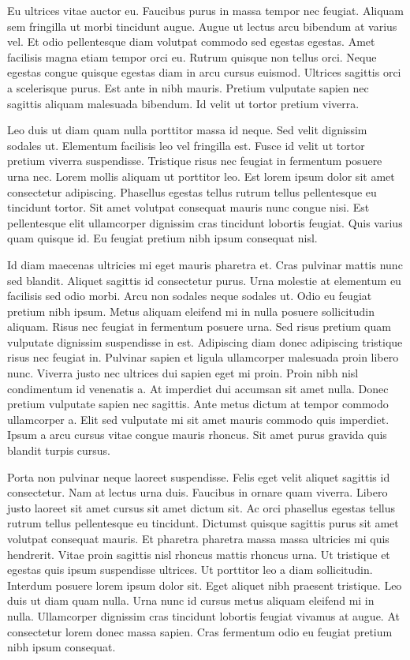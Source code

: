 \documentclass[11pt,a4paper]{article}
\begin{document}
Eu ultrices vitae auctor eu. Faucibus purus in massa tempor nec feugiat. Aliquam sem fringilla ut morbi tincidunt augue. Augue ut lectus arcu bibendum at varius vel. Et odio pellentesque diam volutpat commodo sed egestas egestas. Amet facilisis magna etiam tempor orci eu. Rutrum quisque non tellus orci. Neque egestas congue quisque egestas diam in arcu cursus euismod. Ultrices sagittis orci a scelerisque purus. Est ante in nibh mauris. Pretium vulputate sapien nec sagittis aliquam malesuada bibendum. Id velit ut tortor pretium viverra.

Leo duis ut diam quam nulla porttitor massa id neque. Sed velit dignissim sodales ut. Elementum facilisis leo vel fringilla est. Fusce id velit ut tortor pretium viverra suspendisse. Tristique risus nec feugiat in fermentum posuere urna nec. Lorem mollis aliquam ut porttitor leo. Est lorem ipsum dolor sit amet consectetur adipiscing. Phasellus egestas tellus rutrum tellus pellentesque eu tincidunt tortor. Sit amet volutpat consequat mauris nunc congue nisi. Est pellentesque elit ullamcorper dignissim cras tincidunt lobortis feugiat. Quis varius quam quisque id. Eu feugiat pretium nibh ipsum consequat nisl.

Id diam maecenas ultricies mi eget mauris pharetra et. Cras pulvinar mattis nunc sed blandit. Aliquet sagittis id consectetur purus. Urna molestie at elementum eu facilisis sed odio morbi. Arcu non sodales neque sodales ut. Odio eu feugiat pretium nibh ipsum. Metus aliquam eleifend mi in nulla posuere sollicitudin aliquam. Risus nec feugiat in fermentum posuere urna. Sed risus pretium quam vulputate dignissim suspendisse in est. Adipiscing diam donec adipiscing tristique risus nec feugiat in. Pulvinar sapien et ligula ullamcorper malesuada proin libero nunc. Viverra justo nec ultrices dui sapien eget mi proin. Proin nibh nisl condimentum id venenatis a. At imperdiet dui accumsan sit amet nulla. Donec pretium vulputate sapien nec sagittis. Ante metus dictum at tempor commodo ullamcorper a. Elit sed vulputate mi sit amet mauris commodo quis imperdiet. Ipsum a arcu cursus vitae congue mauris rhoncus. Sit amet purus gravida quis blandit turpis cursus.

Porta non pulvinar neque laoreet suspendisse. Felis eget velit aliquet sagittis id consectetur. Nam at lectus urna duis. Faucibus in ornare quam viverra. Libero justo laoreet sit amet cursus sit amet dictum sit. Ac orci phasellus egestas tellus rutrum tellus pellentesque eu tincidunt. Dictumst quisque sagittis purus sit amet volutpat consequat mauris. Et pharetra pharetra massa massa ultricies mi quis hendrerit. Vitae proin sagittis nisl rhoncus mattis rhoncus urna. Ut tristique et egestas quis ipsum suspendisse ultrices. Ut porttitor leo a diam sollicitudin. Interdum posuere lorem ipsum dolor sit. Eget aliquet nibh praesent tristique. Leo duis ut diam quam nulla. Urna nunc id cursus metus aliquam eleifend mi in nulla. Ullamcorper dignissim cras tincidunt lobortis feugiat vivamus at augue. At consectetur lorem donec massa sapien. Cras fermentum odio eu feugiat pretium nibh ipsum consequat.
\end{document}
